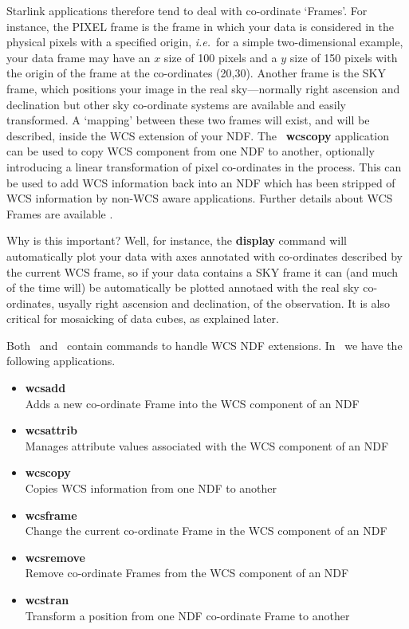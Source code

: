 \documentclass[twoside,11pt]{article}
\newcommand{\htmlref}[2]{#1}
\newcommand{\xref}[3]{#1}
\begin{document}
\begin{\htmlonly}
{Starlink applications therefore tend to deal with co-ordinate
`Frames'.  For instance, the PIXEL frame is the frame in which your
data is considered in the physical pixels with a specified origin,
\emph{i.e.}\ for a simple two-dimensional example, your data frame may
have an $x$ size of 100 pixels and a $y$ size of 150 pixels with the
origin of the frame at the co-ordinates (20,30).  Another frame is the
SKY frame, which positions your image in the real sky---normally
right ascension and declination but other sky co-ordinate systems are
available and easily transformed.  A `mapping' between these two
frames will exist, and will be described, inside the WCS extension of
your NDF.  The \KAPPA\ \xref{{\bf wcscopy}}{sun95}{WCSCOPY} application can
be used to copy WCS component from one NDF to another, optionally
introducing a linear transformation of pixel co-ordinates in the
process.  This can be used to add WCS information back into an NDF
which has been stripped of WCS information by non-WCS aware
applications.  Further details about \xref{WCS Frames}{sun95}{se_resdoms} 
are available .

Why is this important?  Well, for instance, the
\xref{{\bf display}}{sun95}{DISPLAY} command will automatically plot your
data with axes annotated with co-ordinates described by the current
WCS frame, so if your data contains a SKY frame it can (and much of
the time will) be automatically be plotted annotaed with the real sky
co-ordinates, usyally right ascension and declination, of the
observation.  It is also critical for mosaicking of data cubes, as
explained \htmlref{later}{sc16_mos}.

Both \KAPPAref\ and \CCDPACKref\ contain commands to handle WCS NDF
extensions.  In \KAPPA\ we have the following applications.

\begin{itemize}  
\item{\xref{{\bf wcsadd}}{sun95}{WCSADD}}\\
Adds a new co-ordinate Frame into the WCS component of an NDF 
\item{\xref{{\bf wcsattrib}}{sun95}{WCSATTRIB}}\\
Manages attribute values associated with the WCS component of an NDF
\item{\xref{{\bf wcscopy}}{sun95}{WCSCOPY}}\\ 
Copies WCS information from one NDF to another 
\item{\xref{{\bf wcsframe}}{sun95}{WCSFRAME}}\\ 
Change the current co-ordinate Frame in the WCS component of an NDF 
\item{\xref{{\bf wcsremove}}{sun95}{WCSREMOVE}}\\
Remove co-ordinate Frames from the WCS component of an NDF 
\item{\xref{{\bf wcstran}}{sun95}{WCSTRAN}}\\
Transform a position from one NDF co-ordinate Frame to another 
\end{itemize}

}
\end{\htmlonly}
\end{document}
